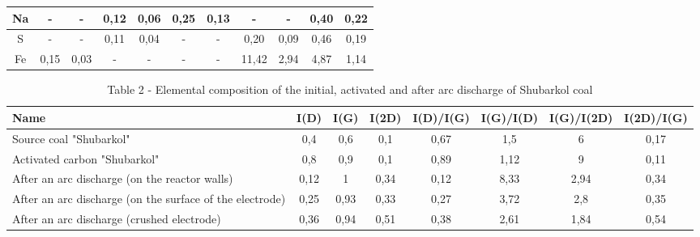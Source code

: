 \begin{table}[H]
\begin{tabular}{|c|cc|cc|cc|cc|cc|}
Na & \multicolumn{1}{c|}{-} & - & \multicolumn{1}{c|}{0,12} & 0,06 & \multicolumn{1}{c|}{0,25} & 0,13 & \multicolumn{1}{c|}{-} & - & \multicolumn{1}{c|}{0,40} & 0,22 \\ \hline
S & \multicolumn{1}{c|}{-} & - & \multicolumn{1}{c|}{0,11} & 0,04 & \multicolumn{1}{c|}{-} & - & \multicolumn{1}{c|}{0,20} & 0,09 & \multicolumn{1}{c|}{0,46} & 0,19 \\ \hline
Fe & \multicolumn{1}{c|}{0,15} & 0,03 & \multicolumn{1}{c|}{-} & - & \multicolumn{1}{c|}{-} & - & \multicolumn{1}{c|}{11,42} & 2,94 & \multicolumn{1}{c|}{4,87} & 1,14 \\ \hline
\end{tabular}
\end{table}


\begin{table}[H]
\caption*{Table 2 - Elemental composition of the initial, activated and after arc discharge of Shubarkol coal}
\centering
\begin{tabular}{|p{}|c|c|c|c|c|c|c|}
\hline
Name & I(D) & I(G) & I(2D) & I(D)/I(G) & I(G)/I(D) & I(G)/I(2D) & I(2D)/I(G) \\ \hline
Source coal "Shubarkol" & 0,4 & 0,6 & 0,1 & 0,67 & 1,5 & 6 & 0,17 \\ \hline
Activated carbon "Shubarkol" & 0,8 & 0,9 & 0,1 & 0,89 & 1,12 & 9 & 0,11 \\ \hline
After an arc discharge (on the reactor walls) & 0,12 & 1 & 0,34 & 0,12 & 8,33 & 2,94 & 0,34 \\ \hline
After an arc discharge (on the surface of the electrode) & 0,25 & 0,93 & 0,33 & 0,27 & 3,72 & 2,8 & 0,35 \\ \hline
After an arc discharge (crushed electrode) & 0,36 & 0,94 & 0,51 & 0,38 & 2,61 & 1,84 & 0,54 \\ \hline
\end{tabular}
\end{table}

